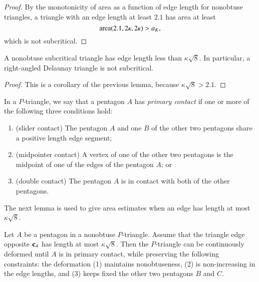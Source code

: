 \begin{proof} By the monotonicity of area as a function of edge length
  for nonobtuse triangles, a triangle with an edge length at least
  $2.1$ has area at least
\[
{\operatorname{area}}(2.1,2\kappa,2\kappa) > a_K,
\] %
which is not subcritical.
\end{proof}

\begin{lemma}\label{lemma:right} 
  A nonobtuse subcritical triangle has edge length less than
  $\kappa\sqrt8$.  In particular, a right-angled Delaunay triangle is
  not subcritical.
\end{lemma}

\begin{proof}  
This is a corollary of the previous lemma, because $\kappa\sqrt8 >
2.1$.
%
\end{proof}


\begin{definition}
In a $P$-triangle, we say that a pentagon $A$ has {\it primary
  contact} if one or more of the following three conditions hold:
\begin{enumerate}
\item (slider contact) The pentagon $A$ and one $B$ of the other two pentagons
share a positive length edge segment;
\item (midpointer contact)  A vertex of one of the other two pentagons
is  the midpoint of one of the edges of the pentagon $A$; or
\item (double contact) The pentagon $A$ is in contact
with both of the other pentagons.
\end{enumerate}
\end{definition}

The next lemma is used to give area
estimates when an edge has length at most $\kappa\sqrt{8}$.

\begin{lemma}\label{lemma:primary-contact} 
  Let $A$ be a pentagon in a nonobtuse $P$-triangle.  Assume that the
  triangle edge opposite ${\mathbf c}_A$ has length at most $\kappa\sqrt{8}$.
  Then the $P$-triangle can be continuously deformed until $A$ is in
  primary contact, while preserving the following constraints: the
  deformation (1) maintains nonobtuseness, (2) is non-increasing in
  the edge lengths, and (3) keeps fixed the other two pentagons $B$
  and $C$.
\end{lemma}


